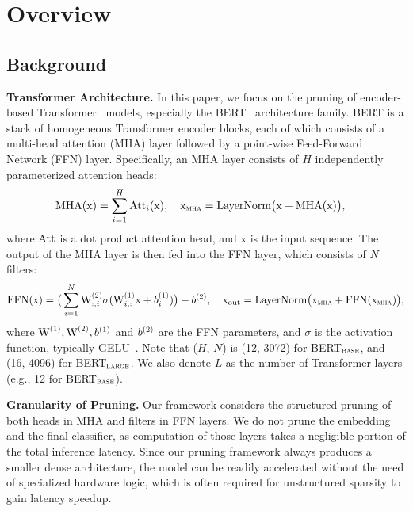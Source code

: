 \vspace{-2mm}
\section{Overview}
\label{sec:overview}

\vspace{-2mm}
\subsection{Background}
\label{subsec:background}
\vspace{-1mm}

\textbf{Transformer Architecture.}
In this paper, we focus on the pruning of encoder-based Transformer~\cite{vaswani2017attention} models, especially the BERT~\cite{devlin2018bert} architecture family.
BERT is a stack of homogeneous Transformer encoder blocks, each of which consists of a multi-head attention (MHA) layer followed by a point-wise Feed-Forward Network (FFN) layer.
Specifically, an MHA layer consists of $H$ independently parameterized attention heads:
\vspace{-2mm}
\begin{align*}
\text{MHA}(\text{x}) &= \sum_{i=1}^{H} \text{Att}_{i}(\text{x}), \quad
\text{x}_\textsc{{mha}} = \text{LayerNorm}\big(\text{x} + \text{MHA}(\text{x})\big),
\end{align*}
where $\text{Att}$ is a dot product attention head, and $\text{x}$ is the input sequence.
The output of the MHA layer is then fed into the FFN layer, which consists of $N$ filters:
\vspace{-1mm}
\begin{align*}
\text{FFN}(\text{x}) = \big(\sum_{i=1}^{N} \textrm{W}^{\textsc{(2)}}_{:,i} \sigma (\textrm{W}^{\textsc{(1)}}_{i,:}\text{x} + b^{\textsc{(1)}}_i)\big) + b^{\textsc{(2)}}, \quad
\text{x}_\mathrm{{out}} = \text{LayerNorm}\big(\text{x}_\textsc{{mha}} + \text{FFN}(\text{x}_\textsc{{mha}})\big),
\end{align*}
where $\textrm{W}^{\textsc{(1)}}, \textrm{W}^{\textsc{(2)}}, b^{\textsc{(1)}}$ and $b^{\textsc{(2)}}$ are the FFN parameters, and $\sigma$ is the activation function, typically GELU~\cite{hendrycks2016gaussian}.
Note that ($H$, $N$) is (12, 3072) for BERT$_\textsc{base}$, and (16, 4096) for BERT$_\textsc{large}$.
We also denote $L$ as the number of Transformer layers (e.g., 12 for BERT$_\textsc{base}$).

\textbf{Granularity of Pruning.}
Our framework considers the structured pruning of both heads in MHA and filters in FFN layers.
We do not prune the embedding and the final classifier, as computation of those layers takes a negligible portion of the total inference latency.
Since our pruning framework always produces a smaller dense architecture, the model can be readily accelerated without the need of specialized hardware logic, which is often required for unstructured sparsity to gain latency speedup.

